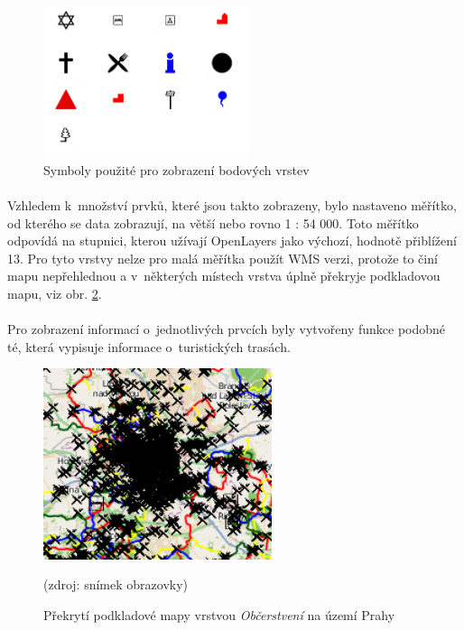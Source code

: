 \documentclass[11pt,a4paper,titlepage,oneside]{book}
\begin{document}
		\begin{figure}[!h]
			\begin{center}
				\includegraphics[width=6cm]{obrazky/toulavej/symbols.png}
				\caption{Symboly použité pro zobrazení bodových vrstev}
				\label{fig:symboly}
			\end{center}
		\end{figure}	

			\paragraph{}Vzhledem k~množství prvků, které jsou takto zobrazeny, bylo nastaveno měřítko, od kterého se data zobrazují, na větší nebo rovno 1 : 54 000. Toto měřítko odpovídá na stupnici, kterou užívají OpenLayers jako výchozí, hodnotě přiblížení 13. Pro tyto vrstvy nelze pro malá měřítka použít \ac{WMS} verzi, protože to činí mapu nepřehlednou a v~některých místech vrstva úplně překryje podkladovou mapu, viz obr. \ref{fig:food}.
		
		\paragraph{}Pro zobrazení informací o~jednotlivých prvcích byly vytvořeny funkce podobné té, která vypisuje informace o~turistických trasách.

\begin{figure}[!h]
			\begin{center}
				\includegraphics[width=6.7cm]{obrazky/toulavej/food.png}
				\caption{Překrytí podkladové mapy vrstvou  \textit{Občerstvení} na území Prahy}
				\label{fig:food}
				(zdroj: snímek obrazovky)
			\end{center}
		\end{figure}	
\end{document}
